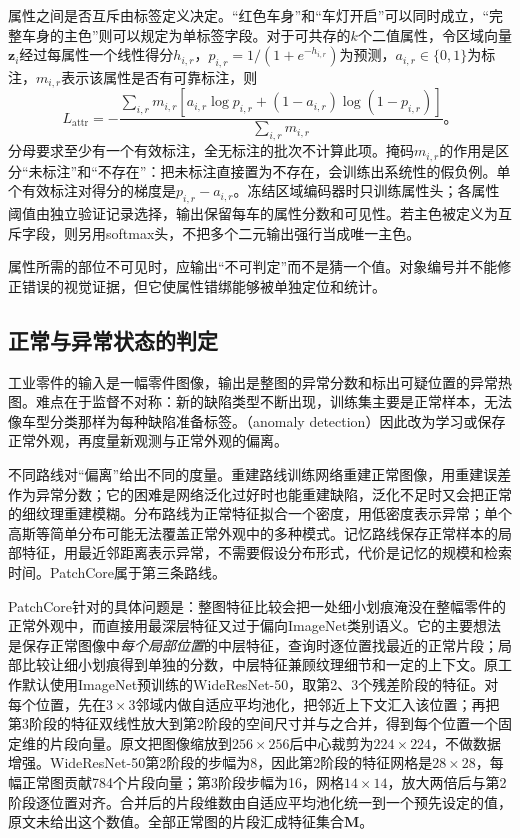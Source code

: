 属性之间是否互斥由标签定义决定。“红色车身”和“车灯开启”可以同时成立，“完整车身的主色”则可以规定为单标签字段。对于可共存的$k$个二值属性，令区域向量$\bm{z}_i$经过每属性一个线性得分$h_{i,r}$，$p_{i,r}=1/(1+e^{-h_{i,r}})$为预测，$a_{i,r}\in\{0,1\}$为标注，$m_{i,r}$表示该属性是否有可靠标注，则
\begin{equation}
 L_{\mathrm{attr}}=
 -\frac{\sum_{i,r}m_{i,r}
 [a_{i,r}\log p_{i,r}+(1-a_{i,r})\log(1-p_{i,r})]}
 {\sum_{i,r}m_{i,r}}\text{。}
 \label{eq:vision-attribute-loss}
\end{equation}
分母要求至少有一个有效标注，全无标注的批次不计算此项。掩码$m_{i,r}$的作用是区分“未标注”和“不存在”：把未标注直接置为不存在，会训练出系统性的假负例。单个有效标注对得分的梯度是$p_{i,r}-a_{i,r}$。冻结区域编码器时只训练属性头；各属性阈值由独立验证记录选择，输出保留每车的属性分数和可见性。若主色被定义为互斥字段，则另用softmax头，不把多个二元输出强行当成唯一主色。

属性所需的部位不可见时，应输出“不可判定”而不是猜一个值。对象编号并不能修正错误的视觉证据，但它使属性错绑能够被单独定位和统计。

\subsection{正常与异常状态的判定}
\label{sec:vision-recognition-anomaly}

工业零件的输入是一幅零件图像，输出是整图的异常分数和标出可疑位置的异常热图。难点在于监督不对称：新的缺陷类型不断出现，训练集主要是正常样本，无法像车型分类那样为每种缺陷准备标签。（anomaly detection）因此改为学习或保存正常外观，再度量新观测与正常外观的偏离。

不同路线对“偏离”给出不同的度量。重建路线训练网络重建正常图像，用重建误差作为异常分数；它的困难是网络泛化过好时也能重建缺陷，泛化不足时又会把正常的细纹理重建模糊。分布路线为正常特征拟合一个密度，用低密度表示异常；单个高斯等简单分布可能无法覆盖正常外观中的多种模式。记忆路线保存正常样本的局部特征，用最近邻距离表示异常，不需要假设分布形式，代价是记忆的规模和检索时间。PatchCore属于第三条路线。

PatchCore针对的具体问题是：整图特征比较会把一处细小划痕淹没在整幅零件的正常外观中，而直接用最深层特征又过于偏向ImageNet类别语义。它的主要想法是保存正常图像中\emph{每个局部位置}的中层特征，查询时逐位置找最近的正常片段；局部比较让细小划痕得到单独的分数，中层特征兼顾纹理细节和一定的上下文。原工作默认使用ImageNet预训练的WideResNet-50，取第2、3个残差阶段的特征。对每个位置，先在$3\times3$邻域内做自适应平均池化，把邻近上下文汇入该位置；再把第3阶段的特征双线性放大到第2阶段的空间尺寸并与之合并，得到每个位置一个固定维的片段向量。原文把图像缩放到$256\times256$后中心裁剪为$224\times224$，不做数据增强。WideResNet-50第2阶段的步幅为8，因此第2阶段的特征网格是$28\times28$，每幅正常图贡献784个片段向量；第3阶段步幅为16，网格$14\times14$，放大两倍后与第2阶段逐位置对齐。合并后的片段维数由自适应平均池化统一到一个预先设定的值，原文未给出这个数值。全部正常图的片段汇成特征集合$\bm{M}$。


